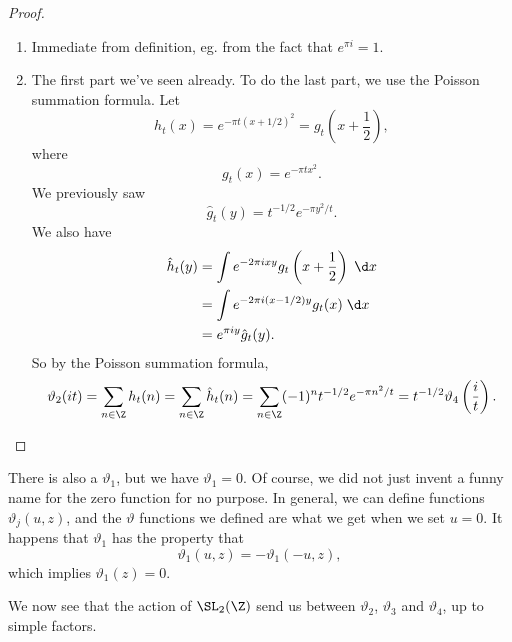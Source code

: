 \documentclass[a4paper]{article}
\begin{document}
\begin{proof}\leavevmode
  \begin{enumerate}
    \item Immediate from definition, eg. from the fact that $e^{\pi i} = 1$.
    \item The first part we've seen already. To do the last part, we use the Poisson summation formula. Let
      \[
        h_t(x) = e^{-\pi t(x + 1/2)^2} = g_t\left(x + \frac{1}{2}\right),
      \]
      where
      \[
        g_t(x) = e^{-\pi tx^2}.
      \]
      We previously saw
      \[
        \hat{g}_t(y) = t^{-1/2} e^{-\pi y^2/t}.
      \]
      We also have
      \begin{align*}
        \hat{h}_t(y) &= \int e^{-2\pi i xy} g_t\left(x + \frac{1}{2}\right)\;\d x \\
        &= \int e^{-2\pi i (x - 1/2) y} g_t(x) \;\d x \\
        &= e^{\pi i y} \hat{g}_t(y).
      \end{align*}
      So by the Poisson summation formula,
      \[
        \vartheta_2(it) = \sum_{n \in \Z} h_t(n) = \sum_{n \in \Z} \hat{h}_t(n) = \sum_{n \in \Z} (-1)^n t^{-1/2} e^{-\pi n^2/t} = t^{-1/2} \vartheta_4 \left(\frac{i}{t}\right).
      \]
  \end{enumerate}
\end{proof}
There is also a $\vartheta_1$, but we have $\vartheta_1 = 0$. Of course, we did not just invent a funny name for the zero function for no purpose. In general, we can define functions $\vartheta_j(u, z)$, and the $\vartheta$ functions we defined are what we get when we set $u = 0$. It happens that $\vartheta_1$ has the property that
\[
  \vartheta_1(u, z) = - \vartheta_1(-u, z),
\]
which implies $\vartheta_1(z) = 0$.

We now see that the action of $\SL_2(\Z)$ send us between $\vartheta_2$, $\vartheta_3$ and $\vartheta_4$, up to simple factors.
\end{document}
